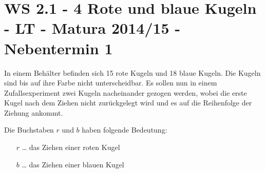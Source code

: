 \section{WS 2.1 - 4 Rote und blaue Kugeln - LT - Matura 2014/15 - Nebentermin 1}

\begin{beispiel}[WS 2.1]{1}
In einem Behälter befinden sich 15 rote Kugeln und 18 blaue Kugeln. Die Kugeln sind bis auf ihre Farbe nicht unterscheidbar. Es sollen nun in einem Zufallsexperiment zwei Kugeln nacheinander gezogen werden, wobei die erste Kugel nach dem Ziehen nicht zurückgelegt wird und es auf die Reihenfolge der Ziehung ankommt. \leer

Die Buchstaben $r$ und $b$ haben folgende Bedeutung:
\begin{itemize}
	\item[$r$ \ldots] das Ziehen einer roten Kugel
	\item[$b$ \ldots] das Ziehen einer blauen Kugel
\end{itemize}

\end{beispiel}